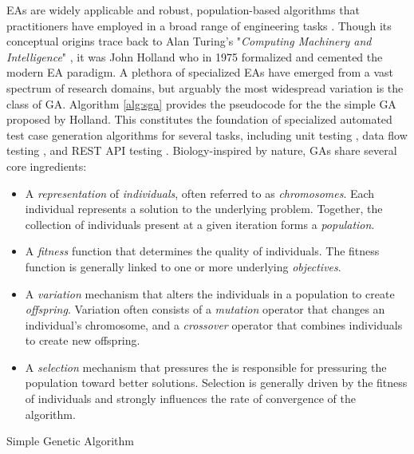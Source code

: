 \gls{EA}s are widely applicable and robust, population-based algorithms
that practitioners have employed in a broad range of engineering tasks \cite{harman2011software}.
Though its conceptual origins trace back to Alan Turing's "\textit{Computing Machinery and Intelligence}" \cite{turing1950computing}, it was John Holland \cite{jh1975adaptation}
who in 1975 formalized and cemented the modern \gls{EA} paradigm.
A plethora of specialized \gls{EA}s have emerged from a vast spectrum of 
research domains, but arguably the most widespread variation is the
class of \Gls{GA}.
Algorithm \ref{alg:sga} provides the pseudocode for the the simple \gls{GA}
proposed by Holland.
This constitutes the foundation of specialized automated test case generation algorithms
for several tasks, including unit testing 
\cite{tonella2004evolutionary, panichella2017automated},
data flow testing \cite{girgis2005automatic}, and REST API testing
\cite{arcuri2019restful}.
Biology-inspired by nature, \gls{GA}s share several core ingredients:
\begin{itemize}
\item A \textit{representation} of \textit{individuals},
	often referred to as \textit{chromosomes}.
	Each individual represents a solution to the underlying
	problem.
	Together, the collection of individuals present at
	a given iteration forms a \textit{population}.

\item A \textit{fitness} function that determines
	the quality of individuals. 
	The fitness function is generally linked
	to one or more underlying \textit{objectives}.

\item A \textit{variation} mechanism that alters
	the individuals in a population to create \textit{offspring}.
	Variation often consists of a \textit{mutation} operator
	that changes an individual's chromosome, and a \textit{crossover}
	operator that combines individuals to create new offspring.
	
\item A \textit{selection} mechanism that pressures the is responsible
	for pressuring the population toward better solutions. Selection
	is generally driven by the fitness of individuals and strongly
	influences the rate of convergence of the algorithm.
\end{itemize}

\begin{algorithm}
	\caption{Simple Genetic Algorithm}
	\BlankLine
	\DontPrintSemicolon
	
\label{alg:sga}
\end{algorithm}

